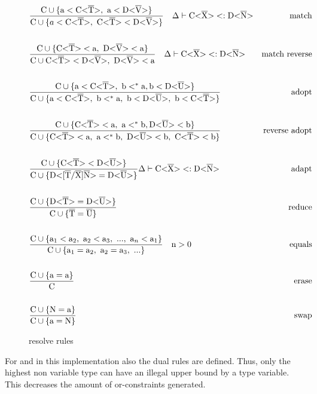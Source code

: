 \begin{figure}[H]
    \begin{align*}
        &\frac{\cand \{ \text{a} < \nvt{C}{T}, \ \text{a} < \nvt{D}{V} \} }{ \cand \{ a < \nvt{C}{T}, \ \nvt{C}{T} < \nvt{D}{V} \} } \quad \Delta \vdash \nvt{C}{X} <: \nvt{D}{N} &\text{match}\\
        \\
        &\frac{\cand \{ \nvt{C}{T} < \text{a}, \ \nvt{D}{V} < \text{a} \} }{ \cand \nvt{C}{T} < \nvt{D}{V}, \ \nvt{D}{V} < \text{a} } \quad \Delta \vdash \nvt{C}{X} <: \nvt{D}{N} &\text{match reverse}\\
        \\
        &\frac{\cand \{ \text{a} < \nvt{C}{T}, \ \text{b} <^* \text{a}, \text{b} < \nvt{D}{U}  \} }{ \cand \{ \text{a} < \nvt{C}{T}, \ \text{b} <^* \text{a}, \ \text{b} < \nvt{D}{U}, \ \text{b} < \nvt{C}{T} \} } &\text{adopt}\\
        \\
        &\frac{\cand \{ \nvt{C}{T} < \text{a}, \ \text{a} <^* \text{b}, \nvt{D}{U} < \text{b} \} }{ \cand \{\nvt{C}{T} < \text{a}, \ \text{a} <^* \text{b}, \ \nvt{D}{U} < \text{b}, \ \nvt{C}{T} < \text{b} \} } &\text{reverse adopt}\\
        \\
        &\frac{\cand \{ \nvt{C}{T} < \nvt{D}{U} \} }{ \cand \{ \text{D<} \tsxsns{T}{X}{N} \text{>} = \nvt{D}{U} \} } \Delta \vdash \nvt{C}{X} <: \nvt{D}{N} &\text{adapt} \\
        \\
        &\frac{\cand \{ \nvt{D}{T} = \nvt{D}{U} \} }{\cand \{ \ot{T} = \ot{U} \} } &\text{reduce} \\
        \\
        &\frac{\cand \{ \text{a}_1 < \text{a}_2, \ \text{a}_2 < \text{a}_3, \ ..., \ \text{a}_n < \text{a}_1 \} }{\cand \{ \text{a}_1 = \text{a}_2, \ \text{a}_2 = \text{a}_3, \ ... \} } \quad \text{n} > 0 &\text{equals} \\
        \\
        &\frac{\cand \{ \text{a} = \text{a} \} }{\text{C}} &\text{erase} \\
        \\
        &\frac{\cand \{ \text{N} = \text{a} \} }{\cand \{ \text{a} = \text{N} \} } &\text{swap}
    \end{align*}
    \caption{resolve rules}
    \label{resolve_rules}
\end{figure}

For  and  in this implementation also the dual rules are defined.
Thus, only the highest non variable type can have an illegal upper bound by a type variable.
This decreases the amount of or-constraints generated.

